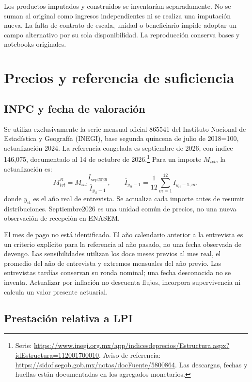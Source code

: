 Los productos imputados y construidos se inventarían separadamente.
No se suman al original como ingresos independientes ni se realiza una
imputación nueva. La falta de contrato de escala, unidad o beneficiario
impide adoptar un campo alternativo por su sola disponibilidad.
La reproducción conserva bases y notebooks originales.

\section{Precios y referencia de suficiencia}
\label{sec:moneda-umbral}

\subsection{INPC y fecha de valoración}

Se utiliza exclusivamente la serie mensual oficial 865541 del Instituto Nacional de Estadística y
Geografía (INEGI),
base segunda quincena de julio de 2018=100, actualización 2024.
La referencia congelada es septiembre de 2026, con índice 146,075,
documentado al 14 de octubre de 2026.\footnote{Serie:
\url{https://www.inegi.org.mx/app/indicesdeprecios/Estructura.aspx?idEstructura=112001700010}.
Aviso de referencia:
\url{https://sidof.segob.gob.mx/notas/docFuente/5800864}.
Las descargas, fechas y huellas están documentadas en los agregados monetarios.}
Para un importe $M_{ivt}$, la actualización es:
\begin{equation}
 M^{R}_{ivt}=M_{ivt}\frac{I_{\mathrm{sep2026}}}{\overline I_{y_{it}-1}},
 \qquad
 \overline I_{y_{it}-1}=\frac1{12}\sum_{m=1}^{12}I_{y_{it}-1,m},
 \label{eq:actualizacion-inpc}
\end{equation}
donde $y_{it}$ es el año real de entrevista. Se actualiza cada importe antes
de resumir distribuciones. Septiembre2026 es una unidad común de precios,
no una nueva observación de recepción en ENASEM.

El mes de pago no está identificado. El año calendario anterior a la entrevista
es un criterio explícito para la referencia al año pasado, no una fecha
observada de devengo. Las sensibilidades utilizan los doce meses previos al
mes real, el promedio del año de entrevista y extremos mensuales del año previo.
Las entrevistas tardías conservan su ronda nominal; una fecha desconocida
no se inventa. Actualizar por inflación no descuenta flujos, incorpora
supervivencia ni calcula un valor presente actuarial.

\subsection{Prestación relativa a LPI}

